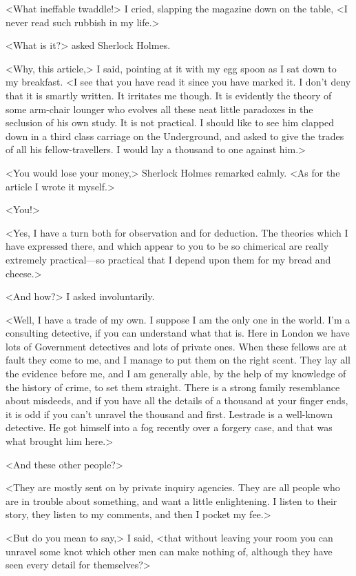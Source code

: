 <What ineffable twaddle!> I cried, slapping the magazine down on the table, <I never read such rubbish in my life.>

<What is it?> asked Sherlock Holmes.

<Why, this article,> I said, pointing at it with my egg spoon as I sat down to my breakfast. <I see that you have read it since you have marked it. I don't deny that it is smartly written. It irritates me though. It is evidently the theory of some arm-chair lounger who evolves all these neat little paradoxes in the seclusion of his own study. It is not practical. I should like to see him clapped down in a third class carriage on the Underground, and asked to give the trades of all his fellow-travellers. I would lay a thousand to one against him.>

<You would lose your money,> Sherlock Holmes remarked calmly. <As for the article I wrote it myself.>

<You!>

<Yes, I have a turn both for observation and for deduction. The theories which I have expressed there, and which appear to you to be so chimerical are really extremely practical—so practical that I depend upon them for my bread and cheese.>

<And how?> I asked involuntarily.

<Well, I have a trade of my own. I suppose I am the only one in the world. I'm a consulting detective, if you can understand what that is. Here in London we have lots of Government detectives and lots of private ones. When these fellows are at fault they come to me, and I manage to put them on the right scent. They lay all the evidence before me, and I am generally able, by the help of my knowledge of the history of crime, to set them straight. There is a strong family resemblance about misdeeds, and if you have all the details of a thousand at your finger ends, it is odd if you can't unravel the thousand and first. Lestrade is a well-known detective. He got himself into a fog recently over a forgery case, and that was what brought him here.>

<And these other people?>

<They are mostly sent on by private inquiry agencies. They are all people who are in trouble about something, and want a little enlightening. I listen to their story, they listen to my comments, and then I pocket my fee.>

<But do you mean to say,> I said, <that without leaving your room you can unravel some knot which other men can make nothing of, although they have seen every detail for themselves?>


